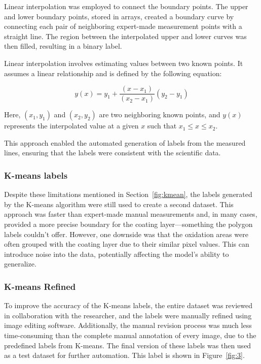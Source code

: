 Linear interpolation was employed to connect the boundary points. The upper and lower boundary points, stored in arrays, created a boundary curve by connecting each pair of neighboring expert-made measurement points with a straight line. The region between the interpolated upper and lower curves was then filled, resulting in a binary label. 

Linear interpolation involves estimating values between two known points. It assumes a linear relationship and is defined by the following equation:

\begin{equation}
y(x) = y_1 + \frac{(x - x_1)}{(x_2 - x_1)} (y_2 - y_1)
\end{equation}

Here, $(x_1, y_1)$ and $(x_2, y_2)$ are two neighboring known points, and $y(x)$ represents the interpolated value at a given $x$ such that $x_1 \leq x \leq x_2$. 

This approach enabled the automated generation of labels from the measured lines, ensuring that the labels were consistent with the scientific data.



\subsubsection{K-means labels} \label{sec:means_mask
}


Despite these limitations mentioned in Section~\ref{fig:kmean}, the labels generated by the K-means algorithm were still used to create a second dataset. This approach was faster than expert-made manual measurements and, in many cases, provided a more precise boundary for the coating layer—something the polygon labels couldn't offer. However, one downside was that the oxidation areas were often grouped with the coating layer due to their similar pixel values. This can introduce noise into the data, potentially affecting the model’s ability to generalize.
\subsubsection{K-means Refined}


To improve the accuracy of the K-means labels, the entire dataset was reviewed in collaboration with the researcher, and the labels were manually refined using image editing software. Additionally, the manual revision process was much less time-consuming than the complete manual annotation of every image, due to the predefined labels from K-means. The final version of these labels was then used as a test dataset for further automation. This label is shown in Figure~\ref{fig:3}.


